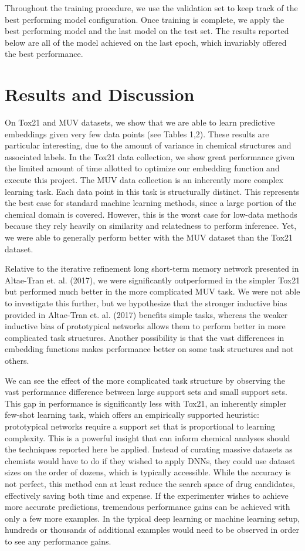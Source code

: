 \documentclass{article}
\begin{document}
Throughout the training procedure, we use the validation set to keep track of the best performing model configuration.  Once training is complete, we apply the best performing model and the last model on the test set.  The results reported below are all of the model achieved on the last epoch, which invariably offered the best performance.


\section{Results and Discussion}
On Tox21 and MUV datasets, we show that we are able to learn predictive embeddings given very few data points (see Tables 1,2).  These results are particular interesting, due to the amount of variance in chemical structures and associated labels.  In the Tox21 data collection, we show great performance given the limited amount of time allotted to optimize our embedding function and execute this project.  The MUV data collection is an inherently more complex learning task.  Each data point in this task is structurally distinct.  This represents the best case for standard machine learning methods, since a large portion of the chemical domain is covered.  However, this is the worst case for low-data methods because they rely heavily on similarity and relatedness to perform inference.  Yet, we were able to generally perform better with the MUV dataset than the Tox21 dataset. 


Relative to the iterative refinement long short-term memory network presented in Altae-Tran et. al. (2017), we were significantly outperformed in the simpler Tox21 but performed much better in the more complicated MUV task.  We were not able to investigate this further, but we hypothesize that the stronger inductive bias provided in Altae-Tran et. al. (2017) benefits simple tasks, whereas the weaker inductive bias of prototypical networks allows them to perform better in more complicated task structures.  Another possibility is that the vast differences in embedding functions makes performance better on some task structures and not others.  


We can see the effect of the more complicated task structure by observing the vast performance difference between large support sets and small support sets.  This gap in performance is significantly less with Tox21, an inherently simpler few-shot learning task, which offers an empirically supported heuristic: prototypical networks require a support set that is proportional to learning complexity.  This is a powerful insight that can inform chemical analyses should the techniques reported here be applied.  Instead of curating massive datasets as chemists would have to do if they wished to apply DNNs, they could use dataset sizes on the order of dozens, which is typically accessible.  While the accuracy is not perfect, this method can at least reduce the search space of drug candidates, effectively saving both time and expense.  If the experimenter wishes to achieve more accurate predictions, tremendous performance gains can be achieved with only a few more examples.  In the typical deep learning or machine learning setup, hundreds or thousands of additional examples would need to be observed in order to see any performance gains.
\end{document}
